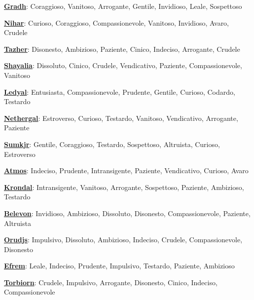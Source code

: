 \begin{multicols}{2}
{\textbf{\hyperlink{gradh}{Gradh}}: Coraggioso, Vanitoso, Arrogante, Gentile, Invidioso, Leale, Sospettoso

\smallskip

\textbf{\hyperlink{nihar}{Nihar}}: Curioso, Coraggioso, Compassionevole, Vanitoso, Invidioso, Avaro, Crudele

\smallskip

\textbf{\hyperlink{tazher}{Tazher}}: Disonesto, Ambizioso, Paziente, Cinico, Indeciso, Arrogante, Crudele

\smallskip

\textbf{\hyperlink{shayalia}{Shayalia}}: Dissoluto, Cinico, Crudele, Vendicativo, Paziente, Compassionevole, Vanitoso

\smallskip

\textbf{\hyperlink{ledyal}{Ledyal}}: Entusiasta, Compassionevole, Prudente, Gentile, Curioso, Codardo, Testardo

\smallskip

\textbf{\hyperlink{nethergal}{Nethergal}}: Estroverso, Curioso, Testardo, Vanitoso, Vendicativo, Arrogante, Paziente

\smallskip

\textbf{\hyperlink{sumkjr}{Sumkjr}}: Gentile, Coraggioso, Testardo, Sospettoso, Altruista, Curioso, Estroverso

\smallskip

\textbf{\hyperlink{atmos}{Atmos}}: Indeciso, Prudente, Intransigente, Paziente, Vendicativo, Curioso, Avaro

\smallskip

\textbf{\hyperlink{krondal}{Krondal}}: Intransigente, Vanitoso, Arrogante, Sospettoso, Paziente, Ambizioso, Testardo

\smallskip

\textbf{\hyperlink{belevon}{Belevon}}: Invidioso, Ambizioso, Dissoluto, Disonesto, Compassionevole, Paziente, Altruista

\smallskip

\textbf{\hyperlink{orudjs}{Orudjs}}: Impulsivo, Dissoluto, Ambizioso, Indeciso, Crudele, Compassionevole, Disonesto

\smallskip

\textbf{\hyperlink{efrem}{Efrem}}: Leale, Indeciso, Prudente, Impulsivo, Testardo, Paziente, Ambizioso

\smallskip

\textbf{\hyperlink{torbiorn}{Torbiorn}}: Crudele, Impulsivo, Arrogante, Disonesto, Cinico, Indeciso, Compassionevole

}
\end{multicols}
